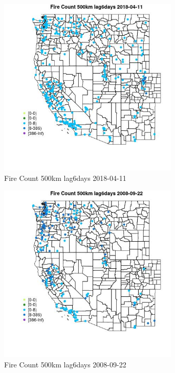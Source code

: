 \begin{figure} 
\centering  
\includegraphics[width=0.77\textwidth]{Code_Outputs/Report_ML_input_PM25_Step4_part_e_de_duplicated_aves_compiled_2019-05-18wNAs_MapObsFire_Count_500km_lag6days2018-04-11.jpg} 
\caption{\label{fig:Report_ML_input_PM25_Step4_part_e_de_duplicated_aves_compiled_2019-05-18wNAsMapObsFire_Count_500km_lag6days2018-04-11}Fire Count 500km lag6days 2018-04-11} 
\end{figure} 
 

\begin{figure} 
\centering  
\includegraphics[width=0.77\textwidth]{Code_Outputs/Report_ML_input_PM25_Step4_part_e_de_duplicated_aves_compiled_2019-05-18wNAs_MapObsFire_Count_500km_lag6days2008-09-22.jpg} 
\caption{\label{fig:Report_ML_input_PM25_Step4_part_e_de_duplicated_aves_compiled_2019-05-18wNAsMapObsFire_Count_500km_lag6days2008-09-22}Fire Count 500km lag6days 2008-09-22} 
\end{figure} 
 

